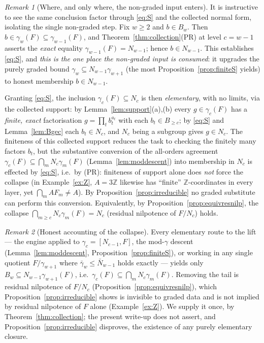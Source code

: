 \documentclass{amsart}
\theoremstyle{definition}
\theoremstyle{remark}
\newtheorem{remark}{Remark}
\begin{document}
\begin{remark}[Where, and only where, the non-graded input enters]\label{rem:onestep}
It is instructive to see the same conclusion factor through \eqref{eq:S} and the collected normal
form, isolating the single non-graded step. Fix $w\ge2$ and $b\in B_w$. Then $b\in\gamma_w(F)
\subseteq\gamma_{w-1}(F)$, and Theorem~\ref{thm:collection}(PR) at level $c=w-1$ asserts the
\emph{exact} equality $\gamma_{w-1}(F)=N_{w-1}$; hence $b\in N_{w-1}$. This establishes
\eqref{eq:S}, and \emph{this is the one place the non-graded input is consumed}: it upgrades the
purely graded bound $\gamma_w\subseteq N_{w-1}\gamma_{w+1}$ (the most
Proposition~\ref{prop:finiteS} yields) to honest membership $b\in N_{w-1}$.

Granting \eqref{eq:S}, the inclusion $\gamma_c(F)\subseteq N_c$ is then \emph{elementary}, with no
limits, via the collected support: by Lemma~\ref{lem:support}(a),(b) every $g\in\gamma_c(F)$ has a
\emph{finite, exact} factorisation $g=\prod_t b_t^{a_t}$ with each $b_t\in B_{\ge c}$; by
\eqref{eq:S} and Lemma~\ref{lem:Bgec} each $b_t\in N_c$, and $N_c$ being a subgroup gives $g\in
N_c$. The finiteness of this collected support reduces the task to checking the finitely many
factors $b_t$, but the substantive conversion of the all-orders agreement
$\gamma_c(F)\subseteq\bigcap_m N_c\gamma_m(F)$ (Lemma~\ref{lem:moddescent}) into membership in
$N_c$ is effected by \eqref{eq:S}, i.e.\ by (PR): finiteness of support alone does \emph{not}
force the collapse \textup{(}in Example~\ref{ex:Z}, $A=3\mathbb Z$ likewise has ``finite''
$\mathbb Z$-coordinates in every layer, yet $\bigcap_m AF_m\ne A$\textup{)}. By
Proposition~\ref{prop:irreducible} no graded substitute can perform this conversion.
Equivalently, by Proposition~\ref{prop:equivresnilp}, the collapse
$\bigcap_{m\ge c}N_c\gamma_m(F)=N_c$ \textup{(}residual nilpotence of $F/N_c$\textup{)} holds.
\end{remark}

\begin{remark}[Honest accounting of the collapse]\label{rem:where}
Every elementary route to the lift --- the engine applied to $\gamma_c=[N_{c-1},F]$, the
mod-$\gamma$ descent (Lemma~\ref{lem:moddescent}, Proposition~\ref{prop:finiteS}), or working in
any single quotient $F/\gamma_{w+1}$ where $\bar\gamma_w\le\bar N_{w-1}$ holds exactly --- yields
only $B_w\subseteq N_{w-1}\gamma_{w+1}(F)$, i.e.\ $\gamma_c(F)\subseteq\bigcap_m N_c\gamma_m(F)$.
Removing the tail is residual nilpotence of $F/N_c$ (Proposition~\ref{prop:equivresnilp}), which
Proposition~\ref{prop:irreducible} shows is invisible to graded data and is not implied by
residual nilpotence of $F$ alone (Example~\ref{ex:Z}). We supply it once, by
Theorem~\ref{thm:collection}; the present write-up does not assert, and
Proposition~\ref{prop:irreducible} disproves, the existence of any purely elementary closure.
\end{remark}
\end{document}
